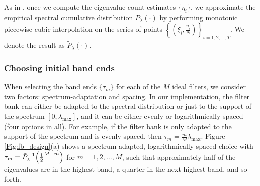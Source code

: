 \documentclass[journal, 10pt]{IEEEtran}
\begin{document}
As in \cite{shuman2013spectrum}, once we compute the eigenvalue count estimates $\{\eta_i\}$, we approximate the empirical spectral cumulative distribution $P_{\lambda}(\cdot)$ by performing monotonic piecewise cubic interpolation \cite{fritsch} on the series of points $\left\{\left(\xi_i,\frac{\eta_i}{N}\right)\right\}_{i=1,2,\ldots,T}$. We denote the result as $\tilde{P}_{\lambda}(\cdot)$.




\subsubsection{Choosing initial band ends}

When selecting the band ends $\{\tau_m\}$ for each of the $M$ ideal filters, we consider two factors: spectrum-adaptation and spacing. In our implementation, the filter bank can either be adapted to the spectral distribution or just to the support of the spectrum $[0,\lambda_{\max}]$, and it can be either evenly or logarithmically spaced (four options in all). For example, if the filter bank is only adapted to the support of the spectrum and is evenly spaced, then $\tau_m=\frac{m}{M}\lambda_{\max}$. Figure \ref{Fig:fb_design}(a) shows a spectrum-adapted, logarithmically spaced choice with $\tau_m=\tilde{P}^{-1}_{\lambda}\Bigl(\frac{1}{2}^{M-m}\Bigr)$ for $m=1,2,\ldots,M$, such that approximately half of the eigenvalues are in the highest band, a quarter in the next highest band, and so forth. 
\end{document}
